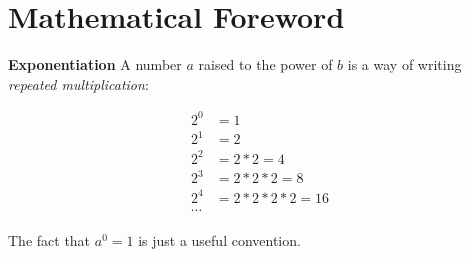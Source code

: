 \chapter{Mathematical Foreword}\label{chpt:mathforeword}

\textbf{Exponentiation} A number $a$ raised to the power of $b$ is a way of
writing \emph{repeated multiplication}:

\begin{align*}
2^0 &= 1\\
2^1 &= 2\\
2^2 &= 2 * 2 = 4\\
2^3 &= 2 * 2 * 2 = 8\\
2^4 &= 2 * 2 * 2 * 2 = 16\\
\cdots
\end{align*}

The fact that $a^0 = 1$ is just a useful convention.

